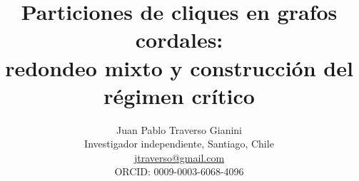 \documentclass[spanish,11pt,a4paper]{article}
\title{Particiones de cliques en grafos cordales:\\redondeo mixto y construcción del régimen crítico}
\author{Juan Pablo Traverso Gianini\\
\small Investigador independiente, Santiago, Chile\\
\small \href{mailto:jtraverso@gmail.com}{jtraverso@gmail.com}\\
\small ORCID: 0009-0003-6068-4096}
\date{}
\begin{document}
\raggedbottom
\maketitle
\end{document}
